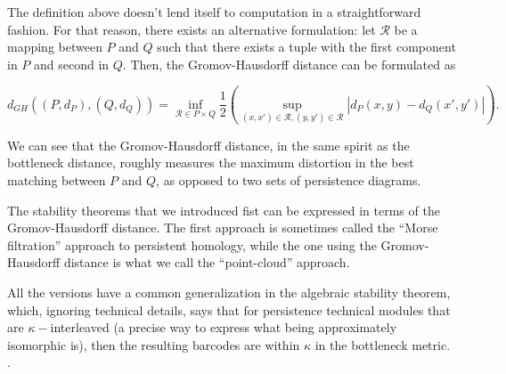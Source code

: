The definition above doesn't lend itself to computation in a straightforward fashion. For that reason, there exists an alternative formulation: let $\mathcal{R}$ be a mapping between $P$ and $Q$ such that there exists a tuple with the first component in $P$ and second in $Q$. Then, the Gromov-Hausdorff distance can be formulated as

\begin{equation*}
  d_{GH}((P, d_{P}), (Q, d_{Q})) = \inf_{\mathcal{R} \in P \times Q}\frac{1}{2}\left(\sup_{(x, x') \in \mathcal{R}, (y, y') \in \mathcal{R}} |d_{P}(x,y) - d_{Q}(x', y')| \right).
\end{equation*}

We can see that the Gromov-Hausdorff distance, in the same spirit as the bottleneck distance, roughly measures the maximum distortion in the best matching between $P$ and $Q$, as opposed to two sets of persistence diagrams.

The stability theorems that we introduced fist can be expressed in terms of the Gromov-Hausdorff distance. The first approach is sometimes called the ``Morse filtration'' approach to persistent homology, while the one using the Gromov-Hausdorff distance is what we call the ``point-cloud'' approach.

All the versions have a common generalization in the algebraic stability theorem, which, ignoring technical details, says that for persistence technical modules that are $\kappa-$interleaved (a precise way to express what being approximately isomorphic is), then the resulting barcodes are within $\kappa$ in the bottleneck metric. \cite{chazal2009proximity}.
